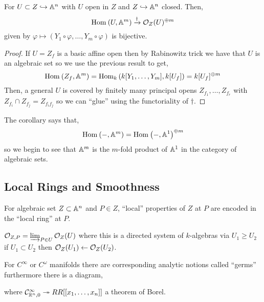 \documentclass[12pt]{article}
\begin{document}
\begin{cor}
For $U \subset Z \hookrightarrow \mathbb{A}^n$ with $U$ open in $Z$ and $Z \hookrightarrow \mathbb{A}^n$ closed. Then,
\[ \mathrm{Hom}_{} \left( U, \mathbb{A}^m \right) \xrightarrow{\dagger} \mathcal{O}_{Z}(U)^{\oplus m} \]
given by $\varphi \mapsto (Y_1 \circ \varphi, \dots, Y_m \circ \varphi)$ is bijective.
\end{cor}

\begin{proof}
If $U = Z_f$ is a basic affine open then by Rabinowitz trick we have that $U$ is an algebraic set so we use the previous result to get,
\[ \mathrm{Hom}_{} \left( Z_f, \mathbb{A}^m \right) = \mathrm{Hom}_{k} \left( k[Y_1, \dots, Y_m], k[U_f] \right) = k[U_f]^{\oplus m} \]
Then, a general $U$ is covered by finitely many principal opens $Z_{f_1}, \dots, Z_{f_r}$ with $Z_{f_i} \cap Z_{f_j} = Z_{f_i f_j}$ so we can ``glue'' using the functoriality of $\dagger$.
\end{proof}

\begin{rmk}
The corollary says that,
\[ \mathrm{Hom}_{} \left( -, \mathbb{A}^m \right) = \mathrm{Hom}_{} \left( -, \mathbb{A}^1 \right)^{\oplus m} \]
so we begin to see that $\mathbb{A}^m$ is the $m$-fold product of $\mathbb{A}^1$ in the category of algebraic sets.
\end{rmk}

\subsection{Local Rings and Smoothness}

For algebraic set $Z \subset \mathbb{A}^n$ and $P \in Z$, ``local'' properties of $Z$ at $P$ are encoded in the ``local ring'' at $P$.

\begin{defn}
$\mathcal{O}_{Z, P} = \varinjlim_{P \in U} \mathcal{O}_{Z}(U)$ where this is a directed system of $k$-algebras via $U_1 \ge U_2$ if $U_1 \subset U_2$ then $\mathcal{O}_{Z}(U_1) \leftarrow \mathcal{O}_{Z}(U_2)$.
\end{defn}

\begin{rmk}
For $C^\infty$ or $C^\omega$ manifolds there are corresponding analytic notions called ``germs'' furthermore there is a diagram,
\begin{center}
\end{center}
where $\mathcal{C}^\infty_{\mathbb{R}^n,0} \twoheadrightarrow RR[[x_1, \dots, x_n]]$ a theorem of Borel.
\end{rmk}
\end{document}
